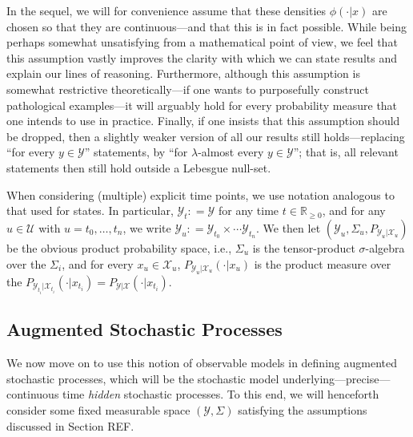 \documentclass[twoside,11pt]{article}
\newcommand{\reals}{\mathbb{R}}
\newcommand{\realsnonneg}{\reals_{\geq 0}}
\newcommand{\states}{\mathcal{X}}
\newcommand{\observs}{\mathcal{Y}}
\newcommand{\coloneqq}{:\!=}
\begin{document}
In the sequel, we will for convenience assume that these densities $\phi(\cdot\vert x)$ are chosen so that they are continuous---and that this is in fact possible. While being perhaps somewhat unsatisfying from a mathematical point of view, we feel that this assumption vastly improves the clarity with which we can state results and explain our lines of reasoning. Furthermore, although this assumption is somewhat restrictive theoretically---if one wants to purposefully construct pathological examples---it will arguably hold for every probability measure that one intends to use in practice. Finally, if one insists that this assumption should be dropped, then a slightly weaker version of all our results still holds---replacing ``for every $y\in\observs$'' statements, by ``for $\lambda$-almost every $y\in\observs$''; that is, all relevant statements then still hold outside a Lebesgue null-set.

When considering (multiple) explicit time points, we use notation analogous to that used for states. In particular, $\observs_t\coloneqq\observs$ for any time $t\in\realsnonneg$, and for any $u\in\mathcal{U}$ with $u=t_0,\ldots,t_n$, we write $\observs_u\coloneqq \observs_{t_0}\times\cdots\observs_{t_n}$. We then let $(\observs_u,\Sigma_u,P_{\observs_u\vert\states_u})$ be the obvious product probability space, i.e., $\Sigma_u$ is the tensor-product $\sigma$-algebra over the $\Sigma_i$, and for every $x_u\in\states_u$, $P_{\observs_u\vert\states_u}(\cdot\vert x_u)$ is the product measure over the $P_{\observs_{t_i}\vert\states_{t_i}}(\cdot\vert x_{t_i})=P_{\observs\vert\states}(\cdot\vert x_{t_i})$.

\subsection{Augmented Stochastic Processes}\label{sec:aug_stochastic_processes}
We now move on to use this notion of observable models in defining augmented stochastic processes, which will be the stochastic model underlying---precise---continuous time \emph{hidden} stochastic processes. To this end, we will henceforth consider some fixed measurable space $(\observs,\Sigma)$ satisfying the assumptions discussed in Section REF. 
\end{document}
